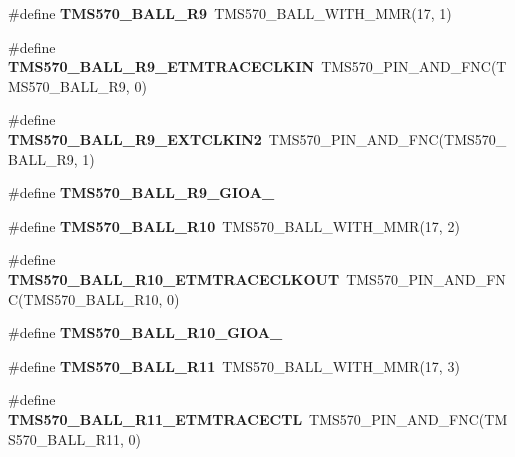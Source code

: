 \begin{DoxyCompactItemize}
\#define {\bfseries T\+M\+S570\+\_\+\+B\+A\+L\+L\+\_\+\+R9}~T\+M\+S570\+\_\+\+B\+A\+L\+L\+\_\+\+W\+I\+T\+H\+\_\+\+M\+MR(17, 1)
\item 
\mbox{\label{tms570lc4357-pins_8h_a38d479c3712cd51fd1d89cb0463a3a05}} 
\#define {\bfseries T\+M\+S570\+\_\+\+B\+A\+L\+L\+\_\+\+R9\+\_\+\+E\+T\+M\+T\+R\+A\+C\+E\+C\+L\+K\+IN}~T\+M\+S570\+\_\+\+P\+I\+N\+\_\+\+A\+N\+D\+\_\+\+F\+NC(T\+M\+S570\+\_\+\+B\+A\+L\+L\+\_\+\+R9, 0)
\item 
\mbox{\label{tms570lc4357-pins_8h_a8a304016db429b999e4f2548e0d8d57c}} 
\#define {\bfseries T\+M\+S570\+\_\+\+B\+A\+L\+L\+\_\+\+R9\+\_\+\+E\+X\+T\+C\+L\+K\+I\+N2}~T\+M\+S570\+\_\+\+P\+I\+N\+\_\+\+A\+N\+D\+\_\+\+F\+NC(T\+M\+S570\+\_\+\+B\+A\+L\+L\+\_\+\+R9, 1)
\item 
\#define {\bfseries T\+M\+S570\+\_\+\+B\+A\+L\+L\+\_\+\+R9\+\_\+\+G\+I\+O\+A\+\_}
\item 
\mbox{\label{tms570lc4357-pins_8h_a14b2b71ca3448940122d369e95d092c7}} 
\#define {\bfseries T\+M\+S570\+\_\+\+B\+A\+L\+L\+\_\+\+R10}~T\+M\+S570\+\_\+\+B\+A\+L\+L\+\_\+\+W\+I\+T\+H\+\_\+\+M\+MR(17, 2)
\item 
\mbox{\label{tms570lc4357-pins_8h_ab39b0472ea88bdacd3829311c2ea8c50}} 
\#define {\bfseries T\+M\+S570\+\_\+\+B\+A\+L\+L\+\_\+\+R10\+\_\+\+E\+T\+M\+T\+R\+A\+C\+E\+C\+L\+K\+O\+UT}~T\+M\+S570\+\_\+\+P\+I\+N\+\_\+\+A\+N\+D\+\_\+\+F\+NC(T\+M\+S570\+\_\+\+B\+A\+L\+L\+\_\+\+R10, 0)
\item 
\#define {\bfseries T\+M\+S570\+\_\+\+B\+A\+L\+L\+\_\+\+R10\+\_\+\+G\+I\+O\+A\+\_}
\item 
\mbox{\label{tms570lc4357-pins_8h_ae8dd95f6c28f00ffa0ebbedfc5e9d085}} 
\#define {\bfseries T\+M\+S570\+\_\+\+B\+A\+L\+L\+\_\+\+R11}~T\+M\+S570\+\_\+\+B\+A\+L\+L\+\_\+\+W\+I\+T\+H\+\_\+\+M\+MR(17, 3)
\item 
\mbox{\label{tms570lc4357-pins_8h_a6882170e05029b60f4b51f27f8195f15}} 
\#define {\bfseries T\+M\+S570\+\_\+\+B\+A\+L\+L\+\_\+\+R11\+\_\+\+E\+T\+M\+T\+R\+A\+C\+E\+C\+TL}~T\+M\+S570\+\_\+\+P\+I\+N\+\_\+\+A\+N\+D\+\_\+\+F\+NC(T\+M\+S570\+\_\+\+B\+A\+L\+L\+\_\+\+R11, 0)
\item 

\end{DoxyCompactItemize}
